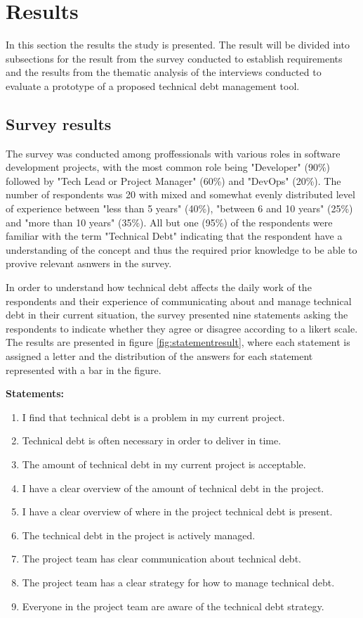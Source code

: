 

\section{Results}
In this section the results the study is presented.
The result will be divided into subsections for the result from the survey conducted to establish requirements and the results from the thematic analysis of the interviews conducted to evaluate a prototype of a proposed technical debt management tool.

\subsection{Survey results}
The survey was conducted among proffessionals with various roles in software development projects, with the most common role being "Developer" (90\%) followed by "Tech Lead or Project Manager" (60\%) and "DevOps" (20\%).
The number of respondents was 20 with mixed and somewhat evenly distributed level of experience between "less than 5 years" (40\%), "between 6 and 10 years" (25\%) and "more than 10 years" (35\%).
All but one (95\%) of the respondents were familiar with the term "Technical Debt" indicating that the respondent have a understanding of the concept and thus the required prior knowledge to be able to provive relevant asnwers in the survey.

In order to understand how technical debt affects the daily work of the respondents and their experience of communicating about and manage technical debt in their current situation, the survey presented nine statements asking the respondents to indicate whether they agree or disagree according to a likert scale. %
The results are presented in figure \ref{fig:statementresult}, where each statement is assigned a letter and the distribution of the answers for each statement represented with a bar in the figure.

\smallskip
\textbf{Statements:}
\begin{enumerate}[label=\alph*)]
  \item I find that technical debt is a problem in my current project.
  \item Technical debt is often necessary in order to deliver in time.
  \item The amount of technical debt in my current project is acceptable.
  \item I have a clear overview of the amount of technical debt in the project.
  \item I have a clear overview of where in the project technical debt is present.
  \item The technical debt in the project is actively managed.
  \item The project team has clear communication about technical debt.
  \item The project team has a clear strategy for how to manage technical debt.
  \item Everyone in the project team are aware of the technical debt strategy.
\end{enumerate}
\smallskip

